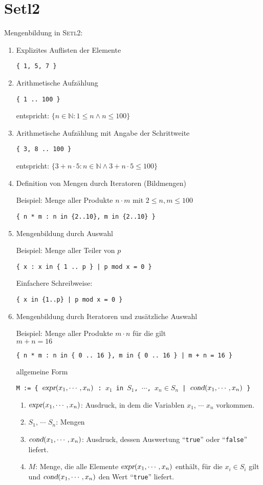 \documentclass{article}
\begin{document}
\section{Setl2}
Mengenbildung in \textsc{Setl2}:
\begin{enumerate}
\item Explizites Auflisten der Elemente 

      \texttt{\{ 1, 5, 7 \}}
\item Arithmetische Aufz\"{a}hlung

      \texttt{\{ 1 .. 100 \}}

      entspricht: \quad $\{ n \in \mathbb{N} : 1 \leq n \wedge n \leq 100 \}$
\item Arithmetische Aufz\"{a}hlung mit Angabe der Schrittweite

      \texttt{\{ 3, 8 .. 100 \}}

      entspricht: \quad $\{ 3 + n \cdot 5 : n \in \mathbb{N} \wedge 3 + n \cdot 5 \leq 100 \}$
\item Definition von Mengen durch Iteratoren (Bildmengen)
      
      Beispiel: Menge aller Produkte $n \cdot m$ mit $2 \leq n, m \leq 100$

      \texttt{\{ n * m : n in \{2..10\}, m in \{2..10\} \}}
\item Mengenbildung durch Auswahl

      Beispiel: Menge aller Teiler von $p$

      \texttt{\{ x : x in \{ 1 .. p \} | p mod x = 0 \}}

      Einfachere Schreibweise:

      \texttt{\{ x in \{1..p\} | p mod x = 0 \}}
\item Mengenbildung durch Iteratoren und zus\"{a}tzliche Auswahl

      Beispiel: Menge aller Produkte $m \cdot n$ f\"{u}r die gilt
      \\[0.1cm]
      \hspace*{1.3cm} $m + n = 16$

      \texttt{\{ n * m : n in \{ 0 .. 16 \}, m in \{ 0 .. 16 \} | m + n = 16 \}}

      allgemeine Form

      \texttt{M := \{ $\textsl{expr}(x_1,\cdots,x_n)$ : $x_1$ in $S_1$, $\cdots$, $x_n \in S_n$ | $\textsl{cond}(x_1,\cdots,x_n)$ \}}
      \begin{enumerate}
      \item $\textsl{expr}(x_1,\cdots,x_n)$: Ausdruck, in dem die Variablen $x_1$, $\cdots$ $x_n$ vorkommen.
      \item $S_1$, $\cdots$ $S_n$: Mengen
      \item $\textsl{cond}(x_1, \cdots, x_n)$: Ausdruck, dessen Auswertung ``\texttt{true}'' 
            oder ``\texttt{false}'' liefert.
      \item $M$: Menge, die alle Elemente  $\textsl{expr}(x_1,\cdots,x_n)$ 
            enth\"{a}lt, f\"{u}r die $x_i \in S_i$ gilt und $\textsl{cond}(x_1, \cdots, x_n)$
            den Wert ``\texttt{true}'' liefert.
      \end{enumerate}
\end{enumerate}
\end{document}
